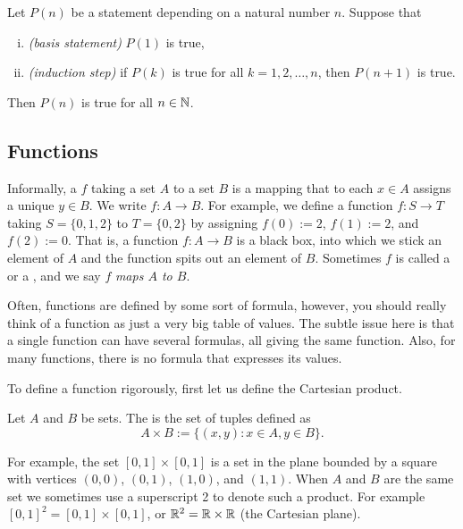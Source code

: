 \begin{thm}
Let $P(n)$ be a statement depending on a natural number $n$.  Suppose that
\begin{enumerate}[(i)]
\item \emph{(basis statement)} $P(1)$ is true,
\item \emph{(induction step)} if $P(k)$ is true for all $k = 1,2,\ldots,n$, then $P(n+1)$ is true.
\end{enumerate}
Then $P(n)$ is true for all $n \in {\mathbb{N}}$.
\end{thm}

\subsection{Functions}

Informally,
a \emph{}
$f$ taking a set $A$ to a set $B$
is a mapping that to each $x \in A$ assigns a unique $y \in B$.  We write
$f \colon A \to B$.  For example, we
define a function $f \colon S \to T$ taking $S = \{ 0, 1, 2 \}$ to $T = \{ 0, 2 \}$
by assigning $f(0) := 2$, $f(1) := 2$, and $f(2) := 0$.  That is, a function $f
\colon A \to B$ is
a black box, into which we stick an element of $A$ and the function
spits out an element of $B$.
Sometimes $f$ is called a \emph{} or a
\emph{},
and we say $f$ \emph{maps $A$ to $B$}.


Often, functions are defined by some sort of
formula, however, you should really think of a function as just a very big
table of values.
The subtle issue here is that a single function can have several 
formulas, all giving the same function.  Also, for many functions, there is
no formula that expresses its values.

To define a function rigorously, first let us define the Cartesian product.

\begin{defn}
Let $A$ and $B$ be sets.  The \emph{}
is the set of tuples defined as
\begin{equation*}
A \times B :=
\{ (x,y) : x \in A, y \in B \} .
\end{equation*}
\end{defn}

For example, the set $[0,1] \times [0,1]$ is a set in the plane
bounded by a square with vertices $(0,0)$, $(0,1)$, $(1,0)$, and $(1,1)$.
When $A$ and $B$ are the same set we sometimes use a superscript 2 to denote
such a product.  For example $[0,1]^2 = 
[0,1] \times [0,1]$, or ${\mathbb{R}}^2 = {\mathbb{R}} \times {\mathbb{R}}$ (the Cartesian plane).


